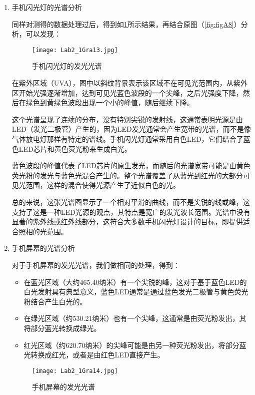 \documentclass[dvipsnames, svgnames,a4paper,11pt]{article}
\begin{document}
\begin{enumerate}
		
		\item 手机闪光灯的光谱分析
		
		同样对测得的数据处理过后，得到如\cref{fig:fig13}所示结果，再结合原图（\cref{fig:figA8}）分析，可以发现：
		
		\begin{figure}[htbp]
			\centering
			\texttt{[image: Lab2\_1Gra13.jpg]}
			\caption{手机闪光灯的发光光谱}
			\label{fig:fig13}
		\end{figure}
		
		在紫外区域（UVA），图中以斜纹背景表示该区域不在可见光范围内，从紫外区开始光强逐渐增加，达到可见光蓝色波段的一个尖峰，之后光强度下降，然后在绿色到黄绿色波段出现一个小的峰值，随后继续下降。
		
		这个光谱呈现了连续的分布，没有特别尖锐的发射线，这通常表明光源是由LED（发光二极管）产生的，因为LED发光通常会产生宽带的光谱，而不是像气体放电灯那样有特定的谱线。手机闪光灯通常采用白色LED，它们结合了蓝色LED芯片和黄色荧光粉来生成白光。
		
		蓝色波段的峰值代表了LED芯片的原生发光，而随后的光谱宽带可能是由黄色荧光粉的发光与蓝色光混合产生的。整个光谱覆盖了从蓝光到红光的大部分可见光范围，这样的混合使得光源产生了近似白色的光。
		
		总的来说，这张光谱图显示了一个相对平滑的曲线，而不是尖锐的线或峰，这支持了这是一种LED光源的观点，其特点是宽广的发光波长范围。光谱中没有显著的紫外线或红外线部分，这符合大多数手机闪光灯设计的目标，即提供适合照相的光范围。
				
		\item 手机屏幕的光谱分析
		
		对于手机屏幕的发光光谱，我们做相同的处理，得到：
		
		\begin{itemize}
			\item 在蓝光区域（大约465.40纳米）有一个尖锐的峰，这对于基于蓝色LED的白光发射具有典型意义，蓝色LED通常是通过蓝色发光二极管与黄色荧光粉结合产生白光的。
			\item 在绿光区域（约530.21纳米）也有一个尖峰，这通常是由荧光粉发出，其将部分蓝光转换成绿光。
			\item 红光区域（约620.70纳米）的尖峰可能是由另一种荧光粉发出，将部分蓝光转换成红光，或者是由红色LED直接产生。
		\end{itemize}
		
		\begin{figure}[htbp]
			\centering
			\texttt{[image: Lab2\_1Gra14.jpg]}
			\caption{手机屏幕的发光光谱}
			\label{fig:fig14}
		\end{figure}
		

\end{enumerate}
\end{document}
